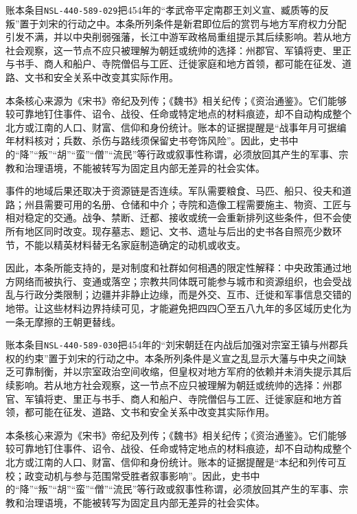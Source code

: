 账本条目\texttt{NSL-440-589-029}把454年的“孝武帝平定南郡王刘义宣、臧质等的反叛”置于刘宋的行动之中。本条所列条件是新君即位后的赏罚与地方军府权力分配引发不满，并以中央削弱强藩，长江中游军政格局重组提示其后续影响。若从地方社会观察，这一节点不应只被理解为朝廷或统帅的选择：州郡官、军镇将吏、里正与书手、商人和船户、寺院僧侣与工匠、迁徙家庭和地方首领，都可能在征发、道路、文书和安全关系中改变其实际作用。

本条核心来源为《宋书》帝纪及列传；《魏书》相关纪传；《资治通鉴》。它们能够较可靠地钉住事件、诏令、战役、任命或特定地点的材料痕迹，却不自动构成整个北方或江南的人口、财富、信仰和身份统计。账本的证据提醒是“战事年月可据编年材料核对；兵数、杀伤与路线须保留史书夸饰风险”。因此，史书中的“降”“叛”“胡”“蛮”“僧”“流民”等行政或叙事性称谓，必须放回其产生的军事、宗教和治理语境，不能被转写为固定且内部无差异的社会实体。

事件的地域后果还取决于资源链是否连续。军队需要粮食、马匹、船只、役夫和道路；州县需要可用的名册、仓储和中介；寺院和造像工程需要施主、物资、工匠与相对稳定的交通。战争、禁断、迁都、接收或统一会重新排列这些条件，但不会使所有地区同时改变。现存墓志、题记、文书、遗址与后出的史书各自照亮少数环节，不能以精英材料替无名家庭制造确定的动机或收支。

因此，本条所能支持的，是对制度和社群如何相遇的限定性解释：中央政策通过地方网络而被执行、变通或落空；宗教共同体既可能参与城市和资源组织，也会受战乱与行政分类限制；边疆并非静止边缘，而是外交、互市、迁徙和军事信息交错的地带。让这些材料边界持续可见，才能避免把四四〇至五八九年的多区域历史化为一条无摩擦的王朝更替线。

账本条目\texttt{NSL-440-589-030}把454年的“刘宋朝廷在内战后加强对宗室王镇与州郡兵权的约束”置于刘宋的行动之中。本条所列条件是义宣之乱显示大藩与中央之间缺乏可靠制衡，并以宗室政治空间收缩，但皇权对地方军府的依赖并未消失提示其后续影响。若从地方社会观察，这一节点不应只被理解为朝廷或统帅的选择：州郡官、军镇将吏、里正与书手、商人和船户、寺院僧侣与工匠、迁徙家庭和地方首领，都可能在征发、道路、文书和安全关系中改变其实际作用。

本条核心来源为《宋书》帝纪及列传；《魏书》相关纪传；《资治通鉴》。它们能够较可靠地钉住事件、诏令、战役、任命或特定地点的材料痕迹，却不自动构成整个北方或江南的人口、财富、信仰和身份统计。账本的证据提醒是“本纪和列传可互校；政变动机与参与范围常受胜者叙事影响”。因此，史书中的“降”“叛”“胡”“蛮”“僧”“流民”等行政或叙事性称谓，必须放回其产生的军事、宗教和治理语境，不能被转写为固定且内部无差异的社会实体。

